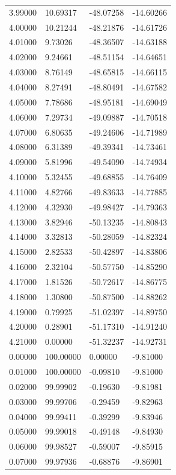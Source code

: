 \begin{table}
\begin{tabular}{llll}
3.99000 & 10.69317 & -48.07258 & -14.60266 \\
4.00000 & 10.21244 & -48.21876 & -14.61726 \\
4.01000 & 9.73026 & -48.36507 & -14.63188 \\
4.02000 & 9.24661 & -48.51154 & -14.64651 \\
4.03000 & 8.76149 & -48.65815 & -14.66115 \\
4.04000 & 8.27491 & -48.80491 & -14.67582 \\
4.05000 & 7.78686 & -48.95181 & -14.69049 \\
4.06000 & 7.29734 & -49.09887 & -14.70518 \\
4.07000 & 6.80635 & -49.24606 & -14.71989 \\
4.08000 & 6.31389 & -49.39341 & -14.73461 \\
4.09000 & 5.81996 & -49.54090 & -14.74934 \\
4.10000 & 5.32455 & -49.68855 & -14.76409 \\
4.11000 & 4.82766 & -49.83633 & -14.77885 \\
4.12000 & 4.32930 & -49.98427 & -14.79363 \\
4.13000 & 3.82946 & -50.13235 & -14.80843 \\
4.14000 & 3.32813 & -50.28059 & -14.82324 \\
4.15000 & 2.82533 & -50.42897 & -14.83806 \\
4.16000 & 2.32104 & -50.57750 & -14.85290 \\
4.17000 & 1.81526 & -50.72617 & -14.86775 \\
4.18000 & 1.30800 & -50.87500 & -14.88262 \\
4.19000 & 0.79925 & -51.02397 & -14.89750 \\
4.20000 & 0.28901 & -51.17310 & -14.91240 \\
4.21000 & 0.00000 & -51.32237 & -14.92731 \\
0.00000 & 100.00000 & 0.00000 & -9.81000 \\
0.01000 & 100.00000 & -0.09810 & -9.81000 \\
0.02000 & 99.99902 & -0.19630 & -9.81981 \\
0.03000 & 99.99706 & -0.29459 & -9.82963 \\
0.04000 & 99.99411 & -0.39299 & -9.83946 \\
0.05000 & 99.99018 & -0.49148 & -9.84930 \\
0.06000 & 99.98527 & -0.59007 & -9.85915 \\
0.07000 & 99.97936 & -0.68876 & -9.86901 \\

\end{tabular}
\end{table}
